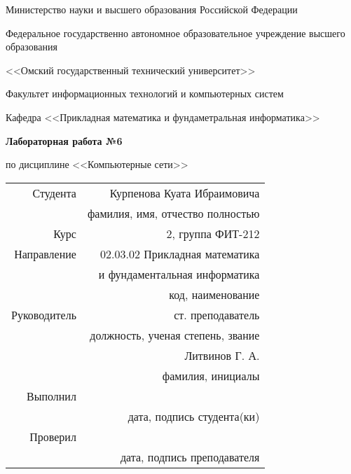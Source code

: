 \documentclass[14pt, a4paper]{article}
\begin{document}
    \thispagestyle{empty}

    \begin{center}
        Министерство науки и высшего образования Российской Федерации

        Федеральное государственно автономное образовательное учреждение высшего образования

        <<Омский государственный технический университет>>

        \vspace{1cm}
        Факультет информационных технологий и компьютерных систем

        Кафедра <<Прикладная математика и фундаметральная информатика>>

        \vspace{3cm}
        \textbf{Лабораторная работа №6}

        по дисциплине <<Компьютерные сети>>
    \end{center}
    
    \vspace{3cm}
    \begin{flushright}    
        \begin{tabular}{ r r }
            Студента & Курпенова Куата Ибраимовича \\
            \cline{2-2}
            & \tiny{фамилия, имя, отчество полностью} \\

            Курс & 2, группа ФИТ-212 \\
            \cline{2-2}
            Направление & 02.03.02 Прикладная математика \\
            \cline{2-2}
            & и фундаментальная информатика \\
            \cline{2-2}
            & \tiny{код, наименование} \\
            
            Руководитель & ст. преподаватель \\
            \cline{2-2}
            & \tiny{должность, ученая степень, звание} \\
            & Литвинов Г. А. \\
            \cline{2-2}
            & \tiny{фамилия, инициалы} \\
            
            Выполнил & \\
            \cline{2-2}
            & \tiny{дата, подпись студента(ки)} \\

            Проверил & \\
            \cline{2-2}
            & \tiny{дата, подпись преподавателя} \\
        \end{tabular}
    \end{flushright}
    
\end{document}
